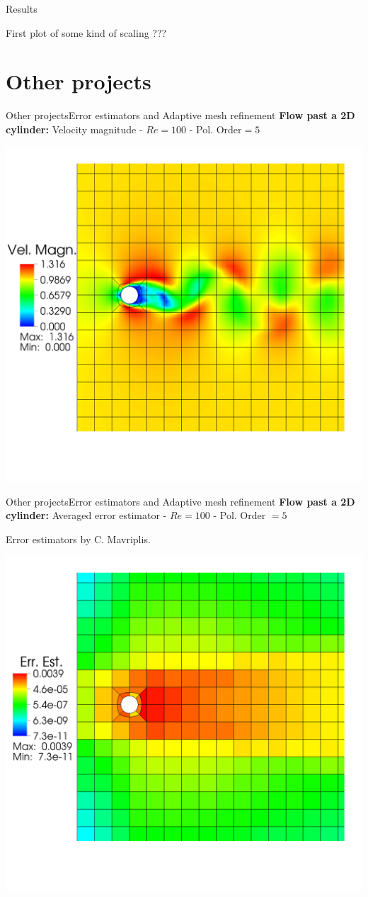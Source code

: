 \documentclass[usenames,dvipsnames,svgnames,9pt]{beamer}
\begin{document}
\begin{frame}{Results}

First plot of some kind of scaling ???

\end{frame}

\section{Other projects}

\begin{frame}{Other projects}{Error estimators and Adaptive mesh refinement}
\textbf{Flow past a 2D cylinder:} Velocity magnitude - $Re=100$ - Pol. Order$ = 5$

\centering
  \includegraphics[trim={0 14.5cm 0 7.2cm},clip, width=0.8\linewidth]{vel_init} 
\end{frame}

\begin{frame}{Other projects}{Error estimators and Adaptive mesh refinement}
\textbf{Flow past a 2D cylinder:} Averaged error estimator - $Re=100$ - Pol. Order $= 5$

Error estimators by C. Mavriplis.

\centering
  \includegraphics[trim={0 14.5cm 0 7.2cm},clip, width=0.8\linewidth]{err_est} 
\end{frame}
\end{document}
